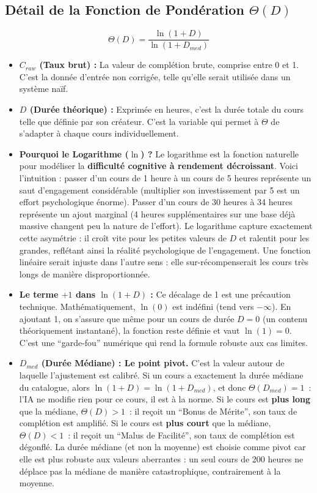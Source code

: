 \documentclass[11pt,a4paper]{article}
\begin{document}
\subsection{Détail de la Fonction de Pondération $\Theta(D)$}
\begin{equation}
\Theta(D) = \frac{\ln(1 + D)}{\ln(1 + D_{med})}
\end{equation}

\begin{itemize}
    \item \textbf{$C_{raw}$ (Taux brut) :} La valeur de complétion brute, comprise entre 0 et 1. C'est la donnée d'entrée non corrigée, telle qu'elle serait utilisée dans un système naïf.

    \item \textbf{$D$ (Durée théorique) :} Exprimée en heures, c'est la durée totale du cours telle que définie par son créateur. C'est la variable qui permet à $\Theta$ de s'adapter à chaque cours individuellement.

    \item \textbf{Pourquoi le Logarithme ($\ln$) ?}
    Le logarithme est la fonction naturelle pour modéliser la \textbf{difficulté cognitive à rendement décroissant}. Voici l'intuition : passer d'un cours de 1 heure à un cours de 5 heures représente un saut d'engagement considérable (multiplier son investissement par 5 est un effort psychologique énorme). Passer d'un cours de 30 heures à 34 heures représente un ajout marginal (4 heures supplémentaires sur une base déjà massive changent peu la nature de l'effort). Le logarithme capture exactement cette asymétrie : il croît vite pour les petites valeurs de $D$ et ralentit pour les grandes, reflétant ainsi la réalité psychologique de l'engagement. Une fonction linéaire serait injuste dans l'autre sens : elle sur-récompenserait les cours très longs de manière disproportionnée.

    \item \textbf{Le terme $+1$ dans $\ln(1 + D)$ :} Ce décalage de 1 est une précaution technique. Mathématiquement, $\ln(0)$ est indéfini (tend vers $-\infty$). En ajoutant 1, on s'assure que même pour un cours de durée $D = 0$ (un contenu théoriquement instantané), la fonction reste définie et vaut $\ln(1) = 0$. C'est une ``garde-fou'' numérique qui rend la formule robuste aux cas limites.

    \item \textbf{$D_{med}$ (Durée Médiane) : Le point pivot.} C'est la valeur autour de laquelle l'ajustement est calibré. Si un cours a exactement la durée médiane du catalogue, alors $\ln(1 + D) = \ln(1 + D_{med})$, et donc $\Theta(D_{med}) = 1$~: l'IA ne modifie rien pour ce cours, il est à la norme. Si le cours est \textbf{plus long} que la médiane, $\Theta(D) > 1$~: il reçoit un ``Bonus de Mérite'', son taux de complétion est amplifié. Si le cours est \textbf{plus court} que la médiane, $\Theta(D) < 1$~: il reçoit un ``Malus de Facilité'', son taux de complétion est dégonflé. La durée médiane (et non la moyenne) est choisie comme pivot car elle est plus robuste aux valeurs aberrantes : un seul cours de 200 heures ne déplace pas la médiane de manière catastrophique, contrairement à la moyenne.
\end{itemize}
\end{document}
